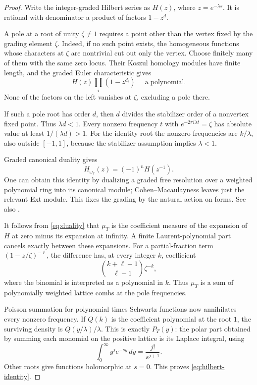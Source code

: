 \documentclass[11pt]{article}
\theoremstyle{definition}
\theoremstyle{remark}
\numberwithin{equation}{section}
\newcommand{\dd}{\,d}
\begin{document}
\begin{proof}
Write the integer-graded Hilbert series as \(H(z)\), where \(z=e^{-\lambda s}\). It is rational with denominator a product of factors \(1-z^d\).

A pole at a root of unity \(\zeta\ne1\) requires a point other than the vertex fixed by the grading element \(\zeta\). Indeed, if no such point exists, the homogeneous functions whose characters at \(\zeta\) are nontrivial cut out only the vertex. Choose finitely many of them with the same zero locus. Their Koszul homology modules have finite length, and the graded Euler characteristic gives
\[
H(z)\prod_i(1-z^{d_i})=\text{a polynomial}.
\]
None of the factors on the left vanishes at \(\zeta\), excluding a pole there.

If such a pole root has order \(d\), then \(d\) divides the stabilizer order of a nonvertex fixed point. Thus \(\lambda d<1\). Every nonzero frequency \(t\) with \(e^{-2\pi i\lambda t}=\zeta\) has absolute value at least \(1/(\lambda d)>1\). For the identity root the nonzero frequencies are \(k/\lambda\), also outside \([-1,1]\), because the stabilizer assumption implies \(\lambda<1\).

Graded canonical duality gives
\begin{equation}\label{eq:duality}
H_{\omega_T}(z)=(-1)^nH(z^{-1}).
\end{equation}
One can obtain this identity by dualizing a graded free resolution over a weighted polynomial ring into its canonical module; Cohen--Macaulayness leaves just the relevant Ext module. This fixes the grading by the natural action on forms. See also \cite[Theorem~6.1(ii)]{Stanley}.

It follows from \eqref{eq:duality} that \(\mu_T\) is the coefficient measure of the expansion of \(H\) at zero minus its expansion at infinity. A finite Laurent-polynomial part cancels exactly between these expansions. For a partial-fraction term \((1-z/\zeta)^{-\ell}\), the difference has, at every integer \(k\), coefficient
\[
\binom{k+\ell-1}{\ell-1}\zeta^{-k},
\]
where the binomial is interpreted as a polynomial in \(k\). Thus \(\mu_T\) is a sum of polynomially weighted lattice combs at the pole frequencies.

Poisson summation for polynomial times Schwartz functions now annihilates every nonzero frequency. If \(Q(k)\) is the coefficient polynomial at the root \(1\), the surviving density is \(Q(y/\lambda)/\lambda\). This is exactly \(P_T(y)\): the polar part obtained by summing each monomial on the positive lattice is its Laplace integral, using
\[
\int_0^\infty y^j e^{-sy}\dd y=\frac{j!}{s^{j+1}}.
\]
Other roots give functions holomorphic at \(s=0\). This proves \eqref{eq:hilbert-identity}.
\end{proof}
\end{document}
